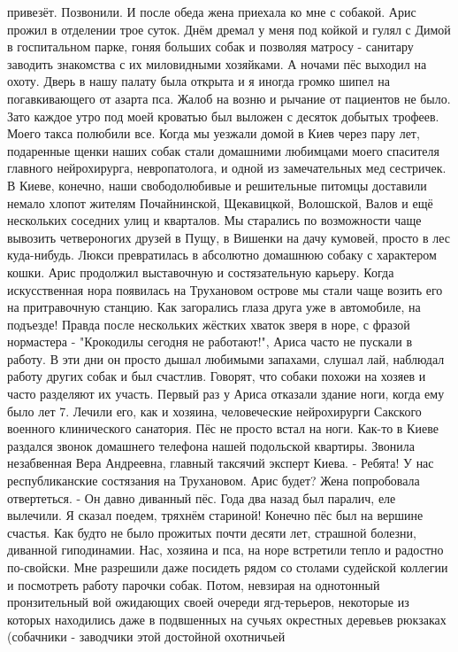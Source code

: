 привезёт. Позвонили. И после обеда жена приехала ко мне с собакой. Арис прожил
в отделении трое суток. Днём дремал у меня под койкой и гулял с Димой в
госпитальном парке, гоняя больших собак и позволяя матросу - санитару заводить
знакомства с их миловидными хозяйками. А ночами пёс выходил на охоту. Дверь в
нашу палату была открыта и я иногда громко шипел на погавкивающего от азарта
пса. Жалоб на возню и рычание от пациентов не было. Зато каждое утро под моей
кроватью был выложен с десяток добытых трофеев. Моего такса полюбили все. Когда
мы уезжали домой в Киев через пару лет, подаренные щенки наших собак стали
домашними любимцами моего спасителя главного нейрохирурга, невропатолога, и
одной из замечательных мед сестричек. В Киеве, конечно, наши свободолюбивые и
решительные питомцы доставили немало хлопот жителям Почайнинской, Щекавицкой,
Волошской, Валов и ещё нескольких соседних улиц и кварталов. Мы старались по
возможности чаще вывозить четвероногих друзей в Пущу, в Вишенки на дачу
кумовей, просто в лес куда-нибудь. Люкси превратилась в абсолютно домашнюю
собаку с характером кошки. Арис продолжил выставочную и состязательную карьеру.
Когда искусственная нора появилась на Трухановом острове мы стали чаще возить
его на притравочную станцию. Как загорались глаза друга уже в автомобиле, на
подъезде! Правда после нескольких жёстких хваток зверя в норе, с фразой
нормастера - "Крокодилы сегодня не работают!", Ариса часто не пускали в работу.
В эти дни он просто дышал любимыми запахами, слушал лай, наблюдал работу других
собак и был счастлив. Говорят, что собаки похожи на хозяев и часто разделяют их
участь. Первый раз у Ариса отказали здание ноги, когда ему было лет 7. Лечили
его, как и хозяина, человеческие нейрохирурги Сакского военного клинического
санатория. Пёс не просто встал на ноги. Как-то в Киеве раздался звонок
домашнего телефона нашей подольской квартиры. Звонила незабвенная Вера
Андреевна, главный таксячий эксперт Киева. - Ребята! У нас республиканские
состязания на Трухановом. Арис будет? Жена попробовала отвертеться. - Он давно
диванный пёс. Года два назад был паралич, еле вылечили. Я сказал поедем,
тряхнём стариной! Конечно пёс был на вершине счастья. Как будто не было
прожитых почти десяти лет, страшной болезни, диванной гиподинамии. Нас, хозяина
и пса, на норе встретили тепло и радостно по-свойски. Мне разрешили даже
посидеть рядом со столами судейской коллегии и посмотреть работу парочки собак.
Потом, невзирая на однотонный пронзительный вой ожидающих своей очереди
ягд-терьеров, некоторые из которых находились даже в подвшенных на сучьях
окрестных деревьев рюкзаках (собачники - заводчики этой достойной охотничьей
